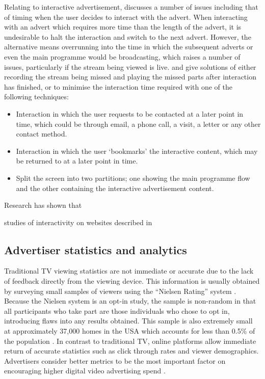 	Relating to interactive advertisement, \citet{integrated-approach-advertising} discusses a number of issues including that of timing when the user decides to interact with the advert. When interacting with an advert which requires more time than the length of the advert, it is undesirable to halt the interaction and switch to the next advert. However, the alternative means overrunning into the time in which the subsequent adverts or even the main programme would be broadcasting, which raises a number of issues, particularly if the stream being viewed is live. \citet{integrated-approach-advertising} and \citet{personalised_interactive_tv_advertising} give solutions of either recording the stream being missed and playing the missed parts after interaction has finished, or to minimise the interaction time required with one of the following techniques:
	\begin{itemize}
		\item Interaction in which the user requests to be contacted at a later point in time, which could be through email, a phone call, a visit, a letter or any other contact method.
		\item Interaction in which the user `bookmarks' the interactive content, which may be returned to at a later point in time.
		\item Split the screen into two partitions; one showing the main programme flow and the other containing the interactive advertisement content. 
	\end{itemize}


	\citet{informationOverload}

	Research has shown that \citet{humanVariables}
	
	studies of interactivity on websites described in \citet{Teo2003281}

\subsection{Advertiser statistics and analytics}
	\label{sec:background_stats}

	Traditional TV viewing statistics are not immediate or accurate due to the lack of feedback directly from the viewing device. This information is usually obtained by surveying small samples of viewers using the ``Nielsen Rating'' system \citep{nielsen-sample}. Because the Nielsen system is an opt-in study, the sample is non-random in that all participants who take part are those individuals who chose to opt in, introducing flaws into any results obtained. This sample is also extremely small at approximately 37,000 homes in the USA which accounts for less than 0.5\% of the population \citep{nielsen-sample}. In contrast to traditional TV, online platforms allow immediate return of accurate statistics such as click through rates and viewer demographics. Advertisers consider better metrics to be the most important factor on encouraging higher digital video advertising spend \citep{brightroll-report}.


